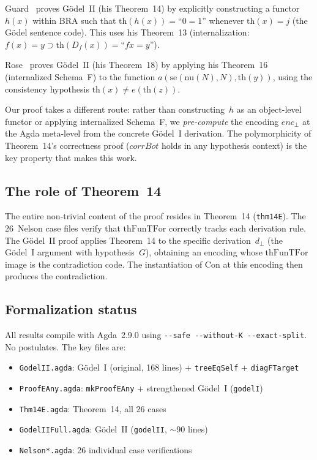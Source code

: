 \documentclass[11pt]{article}
\newcommand{\thFunTFor}{\mathrm{thFunTFor}}
\begin{document}
Guard~\cite{guard1963} proves G\"odel~II (his Theorem~14) by
explicitly constructing a functor~$h(x)$ within BRA such that
$\mathrm{th}(h(x)) = \text{``}0 = 1\text{''}$ whenever
$\mathrm{th}(x) = j$ (the G\"odel sentence code).  This uses
his Theorem~13 (internalization: $f(x) = y \supset
\mathrm{th}(D_f(x)) = \text{``}fx = y\text{''}$).

Rose~\cite{rose1961} proves G\"odel~II (his Theorem~18) by
applying his Theorem~16 (internalized Schema~F) to the function
$a(\mathrm{se}(\mathrm{nu}(N), N), \mathrm{th}(y))$, using the
consistency hypothesis $\mathrm{th}(x) \neq e(\mathrm{th}(z))$.

Our proof takes a different route: rather than constructing~$h$
as an object-level functor or applying internalized Schema~F,
we \emph{pre-compute} the encoding $\mathit{enc}_\bot$ at the
Agda meta-level from the concrete G\"odel~I derivation.
The polymorphicity of Theorem~14's correctness proof
($\mathit{corrBot}$ holds in any hypothesis context) is the
key property that makes this work.

\subsection*{The role of Theorem~14}

The entire non-trivial content of the proof resides in
Theorem~14 (\texttt{thm14E}).  The 26~Nelson case files verify
that $\thFunTFor$ correctly tracks each derivation rule.
The G\"odel~II proof applies Theorem~14 to the specific
derivation~$d_\bot$ (the G\"odel~I argument with hypothesis~$G$),
obtaining an encoding whose $\thFunTFor$ image is the
contradiction code.  The instantiation of $\mathrm{Con}$
at this encoding then produces the contradiction.

\subsection*{Formalization status}

All results compile with Agda~2.9.0 using
\texttt{-{}-safe -{}-without-K -{}-exact-split}.
No postulates.  The key files are:
\begin{itemize}
\item \texttt{GodelII.agda}: G\"odel~I (original, 168 lines) +
  \texttt{treeEqSelf} + \texttt{diagFTarget}
\item \texttt{ProofEAny.agda}: \texttt{mkProofEAny} +
  strengthened G\"odel~I (\texttt{godelI})
\item \texttt{Thm14E.agda}: Theorem~14, all 26 cases
\item \texttt{GodelIIFull.agda}: G\"odel~II
  (\texttt{godelII}, $\sim$90 lines)
\item \texttt{Nelson*.agda}: 26 individual case verifications
\end{itemize}
\end{document}
